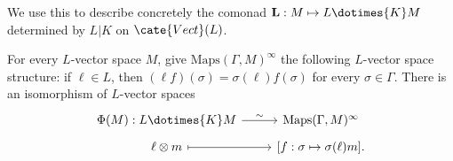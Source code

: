 We use this to describe concretely the comonad
$\mathbf{L}:M\mapsto L\dotimes{K}M$ determined by $L|K$ on
$\cate{Vect}(L)$.

\begin{lemma}\label{prop:Galois-descent-comonad-0}
	For every $L$-vector space $M$, give
	$\mathrm{Maps}(\Gamma,M)^\infty$ the following $L$-vector space
	structure: if $\ell\in L$, then
	$(\ell f)(\sigma)=\sigma(\ell)f(\sigma)$ for every $\sigma\in\Gamma$.
	There is an isomorphism of $L$-vector spaces
	\begin{equation}\label{eqn:comonad-smMap}
		\begin{tikzcd}[row sep=tiny]
			\Phi(M): L \dotimes{K} M \arrow[r, "\sim"] & \mathrm{Maps}(\Gamma, M)^\infty \\
			\ell \otimes m \arrow[mapsto, r] & {\left[ f: \sigma \mapsto \sigma(\ell)m \right]}.
		\end{tikzcd}
	\end{equation}
\end{lemma}
